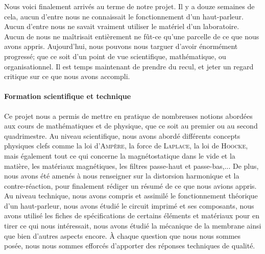 

Nous voici finalement arrivés au terme de notre projet. Il y a douze semaines de cela, aucun 
d'entre nous ne connaissait le fonctionnement d'un haut-parleur. Aucun d'entre nous ne savait vraiment utiliser 
le matériel d'un laboratoire. Aucun de nous ne maîtrisait entièrement ne fût-ce qu'une parcelle de ce que nous 
avons appris. Aujourd'hui, nous pouvons nous targuer d'avoir énormément progressé; que ce soit d'un point de
vue scientifique, mathématique, ou organisationnel. Il est temps maintenant de prendre du recul, et jeter un 
regard critique sur ce que nous avons accompli.

\paragraph{Formation scientifique et technique}
Ce projet nous a permis de mettre en pratique de nombreuses notions abordées aux cours de mathématiques et
de physique, que ce soit au premier ou au second quadrimestre. 
Au niveau scientifique, nous avons abordé différents concepts physiques clefs comme la loi d'\textsc{Ampère},
la force de \textsc{Laplace}, la loi de \textsc{Hoocke}, mais également tout ce qui concerne la 
magnétostatique dans le vide et la matière, les matériaux magnétiques, les filtres passe-haut et passe-bas,...
De plus, nous avons été amenés à nous renseigner sur la distorsion harmonique et la contre-réaction, pour 
finalement rédiger un résumé de ce que nous avions appris.
Au niveau technique, nous avons compris et assimilé le fonctionnement théorique d’un haut-parleur, nous avons
étudié le circuit imprimé et ses composants, nous avons utilisé les fiches de spécifications de certains 
éléments et matériaux pour en tirer ce qui nous intéressait, nous avons étudié la mécanique de la membrane
ainsi que bien d'autres aspects encore.
À chaque question que nous nous sommes posée, nous nous sommes efforcés d'apporter des réponses techniques 
de qualité.

